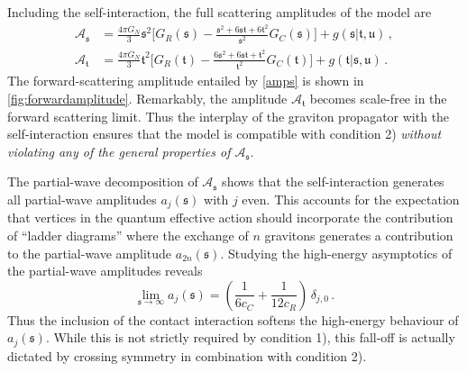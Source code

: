 \documentclass[aps,prl,onecolumn,superscriptaddress,longbibliography,nofootinbib,floatfix,showpacs,12pt]{revtex4-1}
\newcommand{\be}{\begin{equation}}
\newcommand{\ee}{\end{equation}}
\newcommand{\mans}{\ensuremath{\mathfrak{s}}}
\newcommand{\mant}{\ensuremath{\mathfrak{t}}}
\newcommand{\manu}{\ensuremath{\mathfrak{u}}}
\newcommand{\modelname}{model}
\begin{document}
Including the self-interaction, the full scattering amplitudes of the \modelname{} are 
%
\begin{equation}\label{amps}
\begin{aligned}
 \mathcal A_\mans &= \frac{4\pi G_N}{3} \mans^2 \bigg[ G_R(\mans) -	\tfrac{\mans^2+6\mans\mant+6\mant^2}{\mans^2} G_C(\mans) \bigg] + g(\mans|\mant,\manu) \, , \\
 \mathcal A_\mant &= \frac{4\pi G_N}{3} \mant^2 \bigg[ G_R(\mant) -	\tfrac{6\mans^2+6\mans\mant+\mant^2}{\mant^2} G_C(\mant) \bigg] + g(\mant|\mans,\manu) \, .
\end{aligned}
\end{equation}
%
The forward-scattering amplitude entailed by \eqref{amps} is shown in \autoref{fig:forwardamplitude}.
Remarkably, the amplitude $\mathcal A_\mant$  becomes scale-free in the forward scattering limit. 
Thus the interplay of the graviton propagator with the self-interaction ensures that the model is compatible with condition 2) \emph{without violating any of the general properties of $\mathcal A_\mans$}.

 
The partial-wave decomposition of $\mathcal A_\mans$ shows that the self-interaction generates all partial-wave amplitudes $a_j(\mans)$ with $j$ even.
This accounts for the expectation that vertices in the quantum effective action should incorporate the contribution of ``ladder diagrams'' where the exchange of $n$ gravitons  generates a contribution to the partial-wave amplitude $a_{2n}(\mans)$.
Studying the high-energy asymptotics of the partial-wave amplitudes reveals
%
\be\label{spinres}
 \lim_{\mans \rightarrow \infty} a_j(\mans) = \left( \frac{1}{6c_C} + \frac{1}{12c_R} \right) \, \delta_{j,0} \, .%
\ee
%
Thus the inclusion of the contact interaction softens the high-energy behaviour of $a_j(\mans)$. While this is not strictly required by condition 1), this fall-off is actually dictated by crossing symmetry in combination with condition 2).
\end{document}
